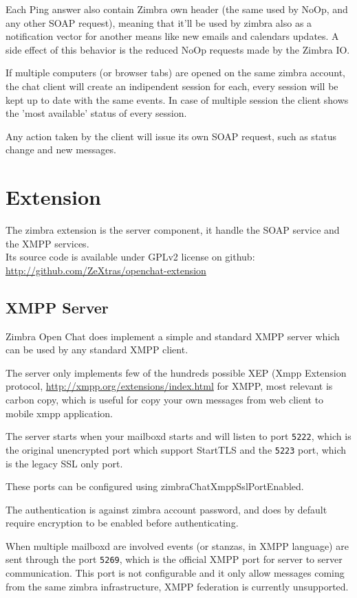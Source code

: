 Each Ping answer also contain Zimbra own header (the same used by NoOp, and any other SOAP request), meaning that it'll
 be used by zimbra also as a notification vector for another means like new emails and calendars updates.
 A side effect of this behavior is the reduced NoOp requests made by the Zimbra IO.

If multiple computers (or browser tabs) are opened on the same zimbra account, the chat client will create an indipendent
 session for each, every session will be kept up to date with the same events. In case of multiple session
 the client shows the 'most available' status of every session.

Any action taken by the client will issue its own SOAP request, such as status change and new messages.
\fi

\section{Extension}
The zimbra extension is the server component, it handle the SOAP service and the XMPP services.\\
Its source code is available under GPLv2 license on github: \url{http://github.com/ZeXtras/openchat-extension}

\ifdefined\INTERNALDOC %
\subsection{XMPP Server}
Zimbra Open Chat does implement a simple and standard XMPP server which can be used by any standard XMPP client.

The server only implements few of the hundreds possible XEP (Xmpp Extension protocol, \url{http://xmpp.org/extensions/index.html} for XMPP,
 most relevant is carbon copy, which is useful for copy your own messages from web client to mobile xmpp application.

The server starts when your mailboxd starts and will listen to port \verb!5222!, which is the original unencrypted port
 which support StartTLS and the \verb!5223! port, which is the legacy SSL only port.

These ports can be configured using zimbraChatXmppSslPortEnabled. %

The authentication is against zimbra account password, and does by default require encryption to be enabled before authenticating.

When multiple mailboxd are involved events (or stanzas, in XMPP language) are sent through the port \verb!5269!,
 which is the official XMPP port for server to server communication.
 This port is not configurable and it only allow messages coming from the same zimbra infrastructure, XMPP federation is currently unsupported.
\fi
